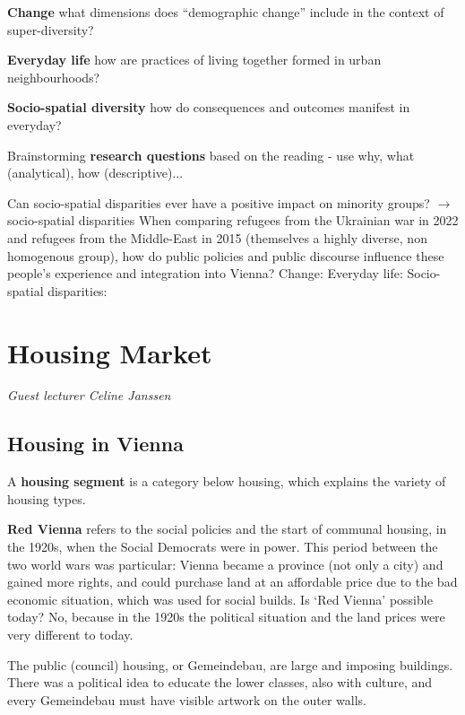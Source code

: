 \documentclass{article}
\begin{document}
\textbf{Change} what dimensions does ``demographic change'' include in the context of super-diversity?

\textbf{Everyday life} how are practices of living together formed in urban neighbourhoods?

\textbf{Socio-spatial diversity} how do consequences and outcomes manifest in everyday?

Brainstorming \textbf{research questions} based on the reading - use why, what (analytical), how (descriptive)...

\begin{outline}
	\1 Can socio-spatial disparities ever have a positive impact on minority groups? $\rightarrow$ socio-spatial disparities
	\1 When comparing refugees from the Ukrainian war in 2022 and refugees from the Middle-East in 2015 (themselves a highly diverse, non homogenous group), how do public policies and public discourse influence these people's experience and integration into Vienna?
		\2 Change:
		\2 Everyday life:
		\2 Socio-spatial disparities:
\end{outline}


\section{Housing Market}

\textit{Guest lecturer Celine Janssen}

\subsection{Housing in Vienna}

A \textbf{housing segment} is a category below housing, which explains the variety of housing types. 

\textbf{Red Vienna} refers to the social policies and the start of communal housing, in the 1920s, when the Social Democrats were in power. This period between the two world wars was particular: Vienna became a province (not only a city) and gained more rights, and could purchase land at an affordable price due to the bad economic situation, which was used for social builds. 
Is `Red Vienna' possible today? No, because in the 1920s the political situation and the land prices were very different to today.

The public (council) housing, or Gemeindebau, are large and imposing buildings. There was a political idea to educate the lower classes, also with culture, and every Gemeindebau must have visible artwork on the outer walls.
\end{document}
